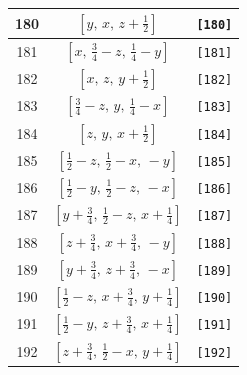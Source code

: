 \documentclass[fleqn,8pt]{jsarticle}
\begin{document}
\begin{longtable}{ccc}
180 & $\left[ y,\, x,\, z + \frac{1}{2} \right]$ & {\tt [180]} \\ \hline
181 & $\left[ x,\, \frac{3}{4} - z,\, \frac{1}{4} - y \right]$ & {\tt [181]} \\ \hline
182 & $\left[ x,\, z,\, y + \frac{1}{2} \right]$ & {\tt [182]} \\ \hline
183 & $\left[ \frac{3}{4} - z,\, y,\, \frac{1}{4} - x \right]$ & {\tt [183]} \\ \hline
184 & $\left[ z,\, y,\, x + \frac{1}{2} \right]$ & {\tt [184]} \\ \hline
185 & $\left[ \frac{1}{2} - z,\, \frac{1}{2} - x,\, - y \right]$ & {\tt [185]} \\ \hline
186 & $\left[ \frac{1}{2} - y,\, \frac{1}{2} - z,\, - x \right]$ & {\tt [186]} \\ \hline
187 & $\left[ y + \frac{3}{4},\, \frac{1}{2} - z,\, x + \frac{1}{4} \right]$ & {\tt [187]} \\ \hline
188 & $\left[ z + \frac{3}{4},\, x + \frac{3}{4},\, - y \right]$ & {\tt [188]} \\ \hline
189 & $\left[ y + \frac{3}{4},\, z + \frac{3}{4},\, - x \right]$ & {\tt [189]} \\ \hline
190 & $\left[ \frac{1}{2} - z,\, x + \frac{3}{4},\, y + \frac{1}{4} \right]$ & {\tt [190]} \\ \hline
191 & $\left[ \frac{1}{2} - y,\, z + \frac{3}{4},\, x + \frac{1}{4} \right]$ & {\tt [191]} \\ \hline
192 & $\left[ z + \frac{3}{4},\, \frac{1}{2} - x,\, y + \frac{1}{4} \right]$ & {\tt [192]} \\
\end{longtable}
\end{document}
